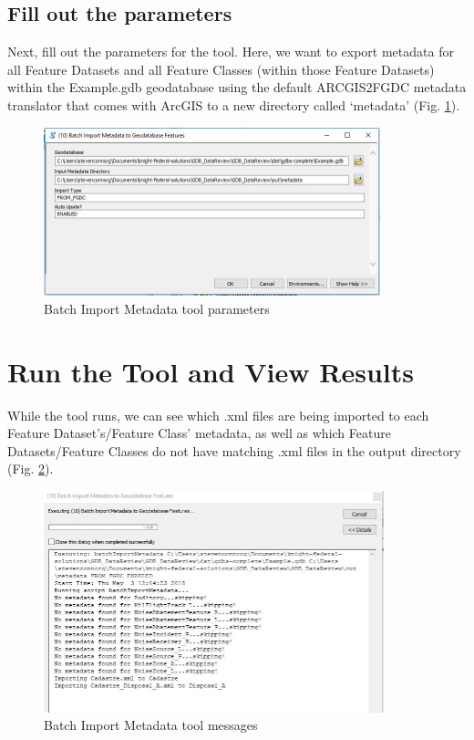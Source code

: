 \documentclass[openany]{book}
\theoremstyle{definition}
\theoremstyle{definition}
\theoremstyle{definition}
\theoremstyle{remark}
\begin{document}
\subsection{Fill out the parameters}\label{fill-out-the-parameters-12}

Next, fill out the parameters for the tool. Here, we want to export
metadata for all Feature Datasets and all Feature Classes (within those
Feature Datasets) within the Example.gdb geodatabase using the default
ARCGIS2FGDC metadata translator that comes with ArcGIS to a new
directory called `metadata' (Fig. \ref{fig:imMetaparams}).

\begin{figure}[H]

{\centering \includegraphics[width=3.84in,]{figures/imMeta-params} 

}

\caption{Batch Import Metadata tool parameters}\label{fig:imMetaparams}
\end{figure}

\section{Run the Tool and View
Results}\label{run-the-tool-and-view-results-12}

While the tool runs, we can see which .xml files are being imported to
each Feature Dataset's/Feature Class' metadata, as well as which Feature
Datasets/Feature Classes do not have matching .xml files in the output
directory (Fig. \ref{fig:imMetamessages}).

\begin{figure}[H]

{\centering \includegraphics[width=3.89in,]{figures/imMeta-messages} 

}

\caption{Batch Import Metadata tool messages}\label{fig:imMetamessages}
\end{figure}
\end{document}
